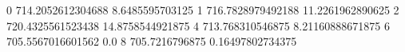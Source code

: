 0 714.2052612304688 8.6485595703125
1 716.7828979492188 11.2261962890625
2 720.4325561523438 14.8758544921875
4 713.768310546875 8.21160888671875
6 705.5567016601562 0.0
8 705.7216796875 0.16497802734375
